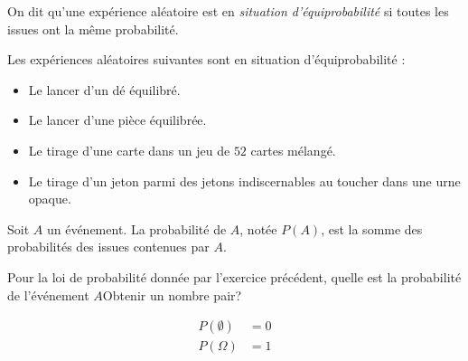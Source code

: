\documentclass{article}
\begin{document}
\begin{definition}
On dit qu'une expérience aléatoire est en \emph{situation d'équiprobabilité} si toutes les issues ont la même probabilité.
\end{definition}
\begin{example}
Les expériences aléatoires suivantes sont en situation d'équiprobabilité :
\begin{itemize}
\item Le lancer d'un dé équilibré.
\item Le lancer d'une pièce équilibrée.
\item Le tirage d'une carte dans un jeu de $52$ cartes mélangé.
\item Le tirage d'un jeton parmi des jetons indiscernables au toucher dans une urne opaque.  
\end{itemize}
\end{example}
\begin{definition}
Soit $A$ un événement. La probabilité de $A$, notée $P(A)$, est la somme des probabilités des issues contenues par $A$.
\end{definition}
\begin{example}
Pour la loi de probabilité donnée par l'exercice précédent, quelle est la probabilité de l'événement $A$\og Obtenir un nombre pair\fg ?
\end{example}
\emptybox{3cm}
\begin{remark}
\begin{equation*}
\begin{aligned}
P(\emptyset) &= 0\\
P(\Omega) &= 1 
\end{aligned}
\end{equation*}
\end{remark}
\newpage
\end{document}
